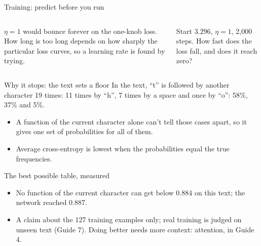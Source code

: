 \documentclass[aspectratio=169,11pt,t,\primeropts]{beamer}
\begin{document}
\begin{frame}{Training: predict before you run}
  \begin{columns}[T]
    \renewcommand\codesize{\scriptsize}
    \vspace{1mm}
    {\small $\eta = 1$ would bounce forever on the one-knob loss. How long is too long depends on
    how sharply the particular loss curves, so a learning rate is found by trying.\par}
    \begin{keyidea}
      Start $3.296$, $\eta = 1$, 2,000 steps. How fast does the loss fall, and does it reach
      zero?
    \end{keyidea}
  \end{columns}
\end{frame}

\begin{frame}{Why it stops: the text sets a floor}
  In the text, ``t'' is followed by another character 19 times: 11 times by ``h'', 7 times by a
  space and once by ``o'': 58\%, 37\% and 5\%.
  \vspace{1mm}
  \begin{itemize}
    \item A function of the current character alone can't tell those cases apart, so it gives
      one set of probabilities for all of them.
    \item<2-> Average cross-entropy is lowest when the probabilities equal the true frequencies.
  \end{itemize}
\end{frame}

\begin{frame}{The best possible table, measured}
  \vspace{1mm}
  \begin{itemize}
    \item No function of the current character can get below $0.884$ on this text; the network
      reached $0.887$.
    \item<2-> A claim about the 127 training examples only; real training is judged on unseen
      text (Guide 7). Doing better needs more context: attention, in Guide 4.
  \end{itemize}
\end{frame}
\end{document}
